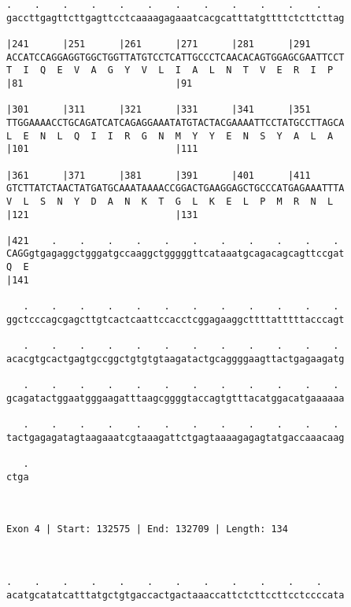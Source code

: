 \documentclass{article}
\begin{document}
\begin{Verbatim}
.    .    .    .    .    .    .    .    .    .    .    .    
gaccttgagttcttgagttcctcaaaagagaaatcacgcatttatgttttctcttcttag
                                                            
|241      |251      |261      |271      |281      |291      
ACCATCCAGGAGGTGGCTGGTTATGTCCTCATTGCCCTCAACACAGTGGAGCGAATTCCT
T  I  Q  E  V  A  G  Y  V  L  I  A  L  N  T  V  E  R  I  P  
|81                           |91                           
  
|301      |311      |321      |331      |341      |351      
TTGGAAAACCTGCAGATCATCAGAGGAAATATGTACTACGAAAATTCCTATGCCTTAGCA
L  E  N  L  Q  I  I  R  G  N  M  Y  Y  E  N  S  Y  A  L  A  
|101                          |111                          
  
|361      |371      |381      |391      |401      |411      
GTCTTATCTAACTATGATGCAAATAAAACCGGACTGAAGGAGCTGCCCATGAGAAATTTA
V  L  S  N  Y  D  A  N  K  T  G  L  K  E  L  P  M  R  N  L  
|121                          |131                          
  
|421    .    .    .    .    .    .    .    .    .    .    . 
CAGGgtgagaggctgggatgccaaggctgggggttcataaatgcagacagcagttccgat
Q  E                                                        
|141                                                        
  
   .    .    .    .    .    .    .    .    .    .    .    . 
ggctcccagcgagcttgtcactcaattccacctcggagaaggcttttatttttacccagt
                                                            
   .    .    .    .    .    .    .    .    .    .    .    . 
acacgtgcactgagtgccggctgtgtgtaagatactgcaggggaagttactgagaagatg
                                                            
   .    .    .    .    .    .    .    .    .    .    .    . 
gcagatactggaatgggaagatttaagcggggtaccagtgtttacatggacatgaaaaaa
                                                            
   .    .    .    .    .    .    .    .    .    .    .    . 
tactgagagatagtaagaaatcgtaaagattctgagtaaaagagagtatgaccaaacaag
                                                            
   .
ctga
    
    
 
Exon 4 | Start: 132575 | End: 132709 | Length: 134



.    .    .    .    .    .    .    .    .    .    .    .    
acatgcatatcatttatgctgtgaccactgactaaaccattctcttccttcctccccata
                                                            

\end{Verbatim}
\end{document}

